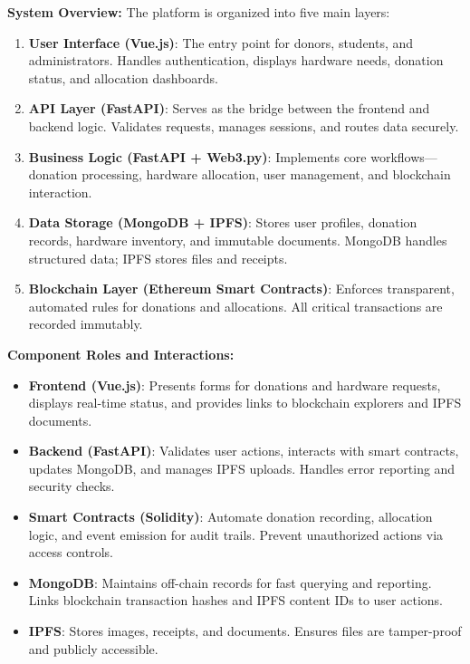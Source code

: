 \documentclass[a4paper,12pt]{report}
\begin{document}
\textbf{System Overview:}
The platform is organized into five main layers:
\begin{enumerate}
    \item \textbf{User Interface (Vue.js)}: The entry point for donors, students, and administrators. Handles authentication, displays hardware needs, donation status, and allocation dashboards.
    \item \textbf{API Layer (FastAPI)}: Serves as the bridge between the frontend and backend logic. Validates requests, manages sessions, and routes data securely.
    \item \textbf{Business Logic (FastAPI + Web3.py)}: Implements core workflows—donation processing, hardware allocation, user management, and blockchain interaction.
    \item \textbf{Data Storage (MongoDB + IPFS)}: Stores user profiles, donation records, hardware inventory, and immutable documents. MongoDB handles structured data; IPFS stores files and receipts.
    \item \textbf{Blockchain Layer (Ethereum Smart Contracts)}: Enforces transparent, automated rules for donations and allocations. All critical transactions are recorded immutably.
\end{enumerate}

\textbf{Component Roles and Interactions:}
\begin{itemize}
    \item \textbf{Frontend (Vue.js)}: Presents forms for donations and hardware requests, displays real-time status, and provides links to blockchain explorers and IPFS documents.
    \item \textbf{Backend (FastAPI)}: Validates user actions, interacts with smart contracts, updates MongoDB, and manages IPFS uploads. Handles error reporting and security checks.
    \item \textbf{Smart Contracts (Solidity)}: Automate donation recording, allocation logic, and event emission for audit trails. Prevent unauthorized actions via access controls.
    \item \textbf{MongoDB}: Maintains off-chain records for fast querying and reporting. Links blockchain transaction hashes and IPFS content IDs to user actions.
    \item \textbf{IPFS}: Stores images, receipts, and documents. Ensures files are tamper-proof and publicly accessible.
\end{itemize}
\end{document}
